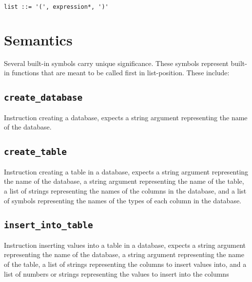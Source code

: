 \documentclass[11pt]{article}
\begin{document}
\begin{verbatim}
list ::= '(', expression*, ')'
\end{verbatim}

\section{Semantics}
\label{sec:orgf15e18b}

Several built-in symbols carry unique significance. These symbols represent built-in functions that are meant to be called first in list-position. These include:

\subsection{\texttt{create\_database}}
\label{sec:orgab16526}

Instruction creating a database, expects a string argument representing the name of the database.

\subsection{\texttt{create\_table}}
\label{sec:org3991051}

Instruction creating a table in a database, expects a string argument representing the name of the database, a string argument representing the name of the table, a list of strings representing the names of the columns in the database, and a list of symbols representing the names of the types of each column in the database.

\subsection{\texttt{insert\_into\_table}}
\label{sec:orgaedf64f}

Instruction inserting values into a table in a database, expects a string argument representing the name of the database, a string argument representing the name of the table, a list of strings representing the columns to insert values into, and a list of numbers or strings representing the values to insert into the columns
\end{document}
